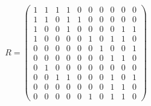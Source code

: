 
\begin{equation}
R = \begin{pmatrix}
  1 & 1 & 1 & 1 & 0 & 0 & 0 & 0 & 0 & 0 \\
  1 & 1 & 0 & 1 & 1 & 0 & 0 & 0 & 0 & 0 \\
  1 & 0 & 0 & 1 & 0 & 0 & 0 & 0 & 1 & 1 \\
  1 & 0 & 0 & 0 & 0 & 1 & 0 & 1 & 1 & 0 \\
  0 & 0 & 0 & 0 & 0 & 0 & 1 & 0 & 0 & 1 \\
  0 & 0 & 0 & 0 & 0 & 0 & 0 & 1 & 1 & 0 \\
  0 & 1 & 0 & 0 & 0 & 0 & 0 & 0 & 0 & 0 \\
  0 & 0 & 1 & 1 & 0 & 0 & 0 & 1 & 0 & 1 \\
  0 & 0 & 0 & 0 & 0 & 0 & 0 & 1 & 1 & 0 \\
  0 & 0 & 0 & 0 & 0 & 1 & 0 & 1 & 1 & 0
\end{pmatrix}
\end{equation}

